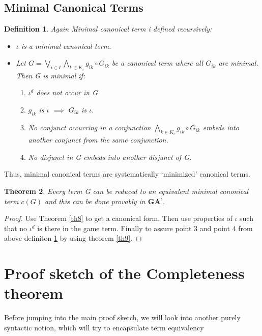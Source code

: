 \documentclass[10pt]{article}
\newcommand{\id}{\iota}
\newtheorem{theorem}{Theorem}
\newtheorem{definition}[theorem]{Definition}
\begin{document}
		\subsection{Minimal Canonical Terms}
		\begin{definition}
			\label{def10}
			Again Minimal canonical term i defined recursively:
			\begin{itemize}
				\item $\id$ is a minimal canonical term.
				\item Let $G = \bigvee_{i\in I}\bigwedge_{k \in K_i} g_{ik}\circ G_{ik}$ be a canonical term where all $G_{ik}$ are minimal. Then G is minimal if:
				\begin{enumerate}
					\item $\id^d$ does not occur in G
					\item $g_{ik}$ is $\id$ $\implies$ $G_{ik}$ is $\id$.
					\item No conjunct occurring in a conjunction $\bigwedge_{k \in K_i}g_{ik} \circ G_{ik}$ embeds into another conjunct from the same conjunction.
					\item No disjunct in G embeds into another disjunct of G.
				\end{enumerate}
			\end{itemize}
		\end{definition}
		Thus, minimal canonical terms are systematically `minimized’ canonical
		terms.
		\begin{theorem}\label{th13}
			Every term G can be reduced to an equivalent minimal
			canonical term $c(G)$ and this can be done provably in $\textbf{GA}^\id$.
		\end{theorem}
		\begin{proof}
			Use Theorem \ref{th8} to get a canonical form. Then use properties of $\id$ such that no $\id^d$ is there in the game term. Finally to assure point 3 and point 4 from above definiton \ref{def10} by using theorem \ref{th9}.
		\end{proof}
		
		\section{Proof sketch of the Completeness theorem}
		Before jumping into the main proof sketch, we will look into another purely syntactic notion, which will try to encapsulate term equivalency
\end{document}
